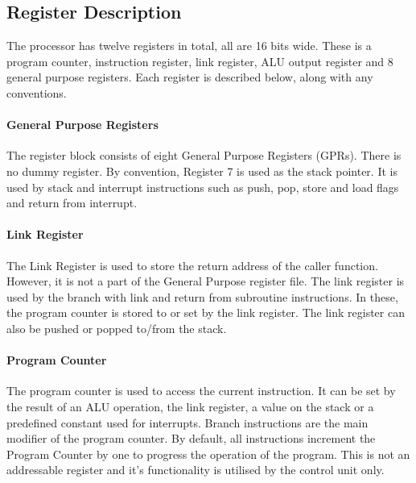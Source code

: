 
\subsection{Register Description}

The processor has twelve registers in total, all are 16 bits wide.
These is a program counter, instruction register, link register, ALU output register and 8 general purpose registers.
Each register is described below, along with any conventions.  

\paragraph{General Purpose Registers}
The register block consists of eight General Purpose Registers (GPRs). 
There is no dummy register. 
By convention, Register 7 is used as the stack pointer. 
It is used by stack and interrupt instructions such as push, pop, store and load flags and return from interrupt.  


\paragraph{Link Register} 
The Link Register is used to store the return address of the caller function. 
However, it is not a part of the General Purpose register file. 
The link register is used by the branch with link and return from subroutine instructions. 
In these, the program counter is stored to or set by the link register. 
The link register can also be pushed or popped to/from the stack.

\paragraph{Program Counter} 
The program counter is used to access the current instruction. 
It can be set by the result of an ALU operation, the link register, a value on the stack or a predefined constant used for interrupts.
Branch instructions are the main modifier of the program counter.
By default, all instructions increment the Program Counter by one to progress the operation of the program. 
This is not an addressable register and it's functionality is utilised by the control unit only. 

